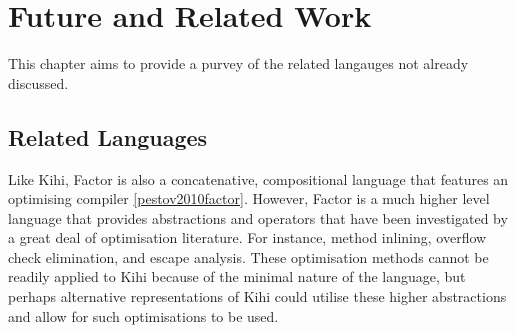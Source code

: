 \chapter{Future and Related Work} \label{C:work} 
This chapter aims to provide a purvey of the related langauges not already discussed.

\section{Related Languages}
Like Kihi, Factor is also a concatenative, compositional language that features an optimising compiler \ref{pestov2010factor}. However, Factor is a much higher level language that provides abstractions and operators that have been investigated by a great deal of optimisation literature. For instance, method inlining, overflow check elimination, and escape analysis. These optimisation methods cannot be readily applied to Kihi because of the minimal nature of the language, but perhaps alternative representations of Kihi could utilise these higher abstractions and allow for such optimisations to be used.

